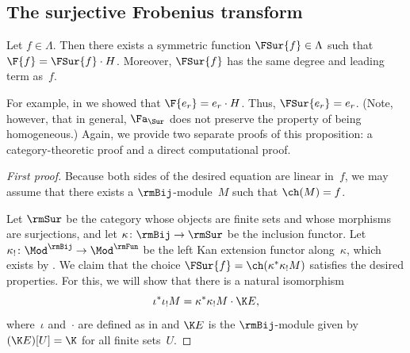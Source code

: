 \subsection{The surjective Frobenius transform}
\begin{prop}
\label{proposition:fsur}
Let $f \in \Lambda$. Then there exists a symmetric function $\FSur{f} \in \Lambda$ such that $\F{f} = \FSur{f} \cdot H$. Moreover, $\FSur{f}$ has the same degree and leading term as~$f$.
\end{prop}
For example, in  we showed that $\F{e_r} = e_r \cdot H$. Thus, $\FSur{e_r} = e_r$. (Note, however, that in general, $\Fa_{\Sur}$ does not preserve the property of being homogeneous.) Again, we provide two separate proofs of this proposition: a category-theoretic proof and a direct computational proof.
\begin{proof}[First proof]
Because both sides of the desired equation are linear in~$f$, we may assume that there exists a $\rmBij$-module~$M$ such that $\ch(M) = f$.

Let $\rmSur$ be the category whose objects are finite sets and whose morphisms are surjections, and let $\kappa \colon \rmBij \to \rmSur$ be the inclusion functor. Let $\kappa_! \colon \Mod^\rmBij \to \Mod^\rmFun$ be the left Kan extension functor along~$\kappa$, which exists by \cite[Proposition~2.6.7]{MR3641124}. We claim that the choice $\FSur{f} = \ch(\kappa^* \kappa_!M)$ satisfies the desired properties. For this, we will show that there is a natural isomorphism
\begin{equation}\label{eq:iotakappa}
    \iota^* \iota_! M = \kappa^* \kappa_! M \cdot \K E,
\end{equation}
where~$\iota$ and~$\cdot$ are defined as in  and $\K E$ is the $\rmBij$-module given by $(\K E)[U] = \K$ for all finite sets~$U$.


\end{proof}
